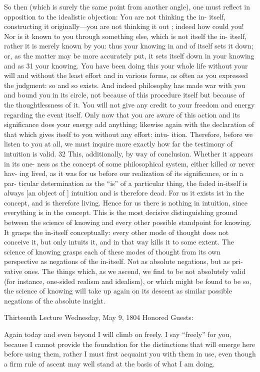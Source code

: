 So then (which is surely the same point from another angle), one must
reflect in opposition to the idealistic objection: You are not thinking the in-
itself, constructing it originally—you are not thinking it out ; indeed how could
you! Nor is it known to you through something else, which is not itself the in-
itself, rather it is merely known by you: thus your knowing in and of itself sets
it down; or, as the matter may be more accurately put, it sets itself down in
your knowing and as 31 your knowing.
You have been doing this your whole life
without your will and without the least effort and in various forms, as often as
you expressed the judgment: so and so exists.
And indeed philosophy has made
war with you and bound you in its circle, not because of this procedure itself
but because of the thoughtlessness of it.
You will not give any credit to your
freedom and energy regarding the event itself.
Only now that you are aware of
this action and its significance does your energy add anything; likewise again
with the declaration of that which gives itself to you without any effort: intu-
ition.
Therefore, before we listen to you at all, we must inquire more exactly
how far the testimony of intuition is valid.
32
This, additionally, by way of conclusion.
Whether it appears in its one-
ness as the concept of some philosophical system, either killed or never hav-
ing lived, as it was for us before our realization of its significance, or in a par-
ticular determination as the “is” of a particular thing, the faded in-itself is
always [an object of ] intuition and is therefore dead.
For us it exists {ist} in the
concept, and is therefore living.
Hence for us there is nothing in intuition, since
everything is in the concept.
This is the most decisive distinguishing ground
between the science of knowing and every other possible standpoint for
knowing.
It grasps the in-itself conceptually: every other mode of thought
does not conceive it, but only intuits it, and in that way kills it to some extent.
The science of knowing grasps each of these modes of thought from its own
perspective as negations of the in-itself.
Not as absolute negations, but as pri-
vative ones.
The things which, as we ascend, we find to be not absolutely valid
(for instance, one-sided realism and idealism), or which might be found to be
so, the science of knowing will take up again on its descent as similar possible
negations of the absolute insight.


Thirteenth Lecture
Wednesday, May 9, 1804
Honored Guests:

Again today and even beyond I will climb on freely.
I say “freely” for you,
because I cannot provide the foundation for the distinctions that will emerge
here before using them, rather I must first acquaint you with them in use, even
though a firm rule of ascent may well stand at the basis of what I am doing.

